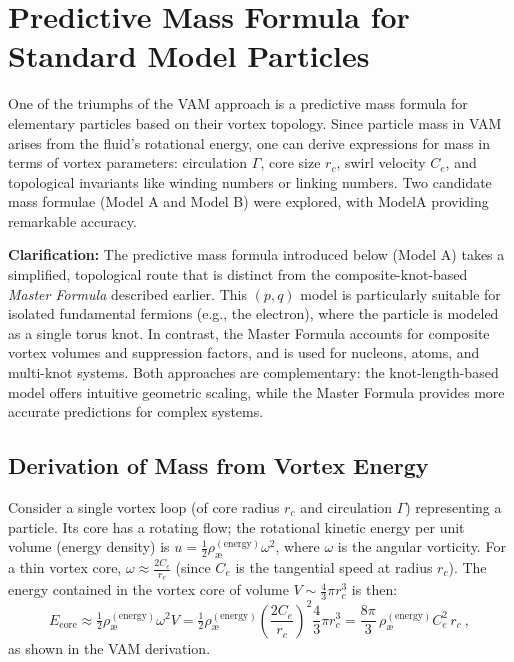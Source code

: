 \section{Predictive Mass Formula for Standard Model Particles}

One of the triumphs of the VAM approach is a predictive mass formula for elementary particles based on their vortex topology. Since particle mass in VAM arises from the fluid's rotational energy, one can derive expressions for mass in terms of vortex parameters: circulation $\Gamma$, core size $r_c$, swirl velocity $C_e$, and topological invariants like winding numbers or linking numbers. Two candidate mass formulae (Model A and Model B) were explored, with ModelA providing remarkable accuracy.

\begin{tcolorbox}[colback=gray!10,colframe=black!40,title=Clarification: Mass Formula Approaches]
    \textbf{Clarification:} The predictive mass formula introduced below (Model A) takes a simplified, topological route that is distinct from the composite-knot-based \textit{Master Formula} described earlier. This \((p,q)\) model is particularly suitable for isolated fundamental fermions (e.g., the electron), where the particle is modeled as a single torus knot. In contrast, the Master Formula accounts for composite vortex volumes and suppression factors, and is used for nucleons, atoms, and multi-knot systems. Both approaches are complementary: the knot-length-based model offers intuitive geometric scaling, while the Master Formula provides more accurate predictions for complex systems.
\end{tcolorbox}

\subsection{Derivation of Mass from Vortex Energy}

Consider a single vortex loop (of core radius $r_c$ and circulation $\Gamma$) representing a particle. Its core has a rotating flow; the rotational kinetic energy per unit volume (energy density) is $u = \tfrac{1}{2}\rho_{\text{\ae}}^{(\text{energy})}\omega^2$, where $\omega$ is the angular vorticity. For a thin vortex core, $\omega \approx \frac{2 C_e}{r_c}$ (since $C_e$ is the tangential speed at radius $r_c$). The energy contained in the vortex core of volume $V \sim \frac{4}{3}\pi r_c^3$ is then:
\[
    E_{\text{core}} \approx \tfrac{1}{2}\rho_{\text{\ae}}^{(\text{energy})}\omega^2 V = \tfrac{1}{2}\rho_{\text{\ae}}^{(\text{energy})}\left(\frac{2C_e}{r_c}\right)^2 \frac{4}{3}\pi r_c^3 = \frac{8\pi}{3}\,\rho_{\text{\ae}}^{(\text{energy})} C_e^2\, r_c~,
\]
as shown in the VAM derivation.


